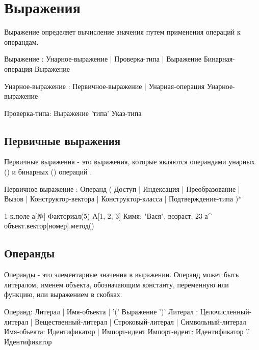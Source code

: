 \hypertarget{expressions}{%
\section{Выражения}\label{expr:chapter}}

Выражение определяет вычисление значения путем применения операций к операндам. 

\begin{Grammar}
Выражение
    : Унарное-выражение
    | Проверка-типа
    | Выражение Бинарная-операция Выражение

Унарное-выражение
    : Первичное-выражение
    | Унарная-операция Унарное-выражение
    
Проверка-типа: Выражение 'типа' Указ-типа 
\end{Grammar}    

\hypertarget{primary-expr}{%
\subsection{Первичные выражения}\label{expr:primary-expr}}

Первичные выражения - это выражения, которые являются операндами унарных () и бинарных () операций .

\begin{Grammar}
Первичное-выражение
    : Операнд
    ( Доступ
    | Индексация
    | Преобразование
    | Вызов
    | Конструктор-вектора
    | Конструктор-класса
    | Подтверждение-типа
    )*
\end{Grammar}    

\begin{Trivil}
1
к.поле
а[№]
Факториал(5)
А[1, 2, 3]
К{имя: "Вася", возраст: 23}
а^
объект.вектор[номер].метод()
\end{Trivil}

\hypertarget{operands}{%
\subsection{Операнды}\label{expr:operands}}

Операнды - это элементарные значения в выражении. Операнд может быть литералом, именем объекта, 
обозначающим константу, переменную или функцию, или выражением в скобках.

\begin{Grammar}
Операнд: Литерал | Имя-объекта | '(' Выражение ')'
Литерал
    : Целочисленный-литерал
    | Вещественный-литерал
    | Строковый-литерал
    | Символьный-литерал
Имя-объекта: Идентификатор | Импорт-идент
Импорт-идент: Идентификатор '.' Идентификатор
\end{Grammar}    

